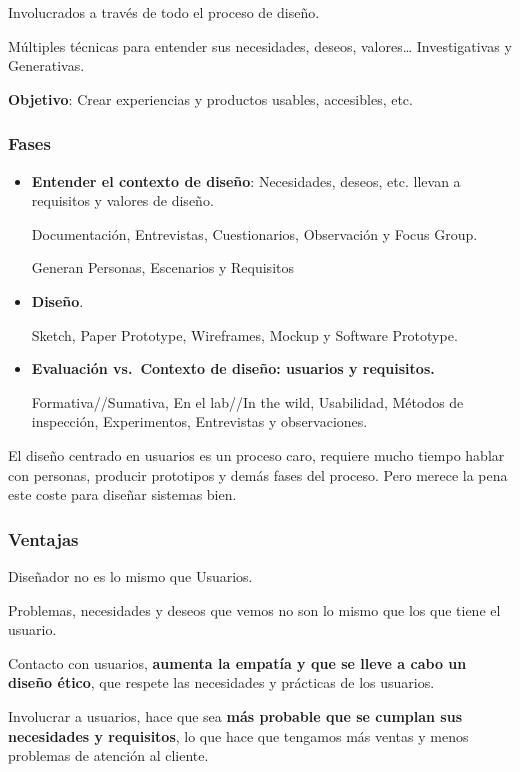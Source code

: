 Involucrados a través de todo el proceso de diseño.

Múltiples técnicas para entender sus necesidades, deseos,
valores\ldots{} Investigativas y Generativas.

\textbf{Objetivo}: Crear experiencias y productos usables, accesibles,
etc.

\hypertarget{fases}{%
\subsubsection{Fases}\label{fases}}

\begin{itemize}
\item
  \textbf{Entender el contexto de diseño}: Necesidades, deseos, etc.
  llevan a requisitos y valores de diseño.

  Documentación, Entrevistas, Cuestionarios, Observación y Focus Group.

  Generan Personas, Escenarios y Requisitos
\item
  \textbf{Diseño}.

  Sketch, Paper Prototype, Wireframes, Mockup y Software Prototype.
\item
  \textbf{Evaluación vs.~Contexto de diseño: usuarios y requisitos.}

  Formativa//Sumativa, En el lab//In the wild, Usabilidad, Métodos de
  inspección, Experimentos, Entrevistas y observaciones.
\end{itemize}

El diseño centrado en usuarios es un proceso caro, requiere mucho tiempo
hablar con personas, producir prototipos y demás fases del proceso. Pero
merece la pena este coste para diseñar sistemas bien.

\hypertarget{ventajas}{%
\subsubsection{Ventajas}\label{ventajas}}

Diseñador no es lo mismo que Usuarios.

Problemas, necesidades y deseos que vemos no son lo mismo que los que
tiene el usuario.

Contacto con usuarios, \textbf{aumenta la empatía y que se lleve a cabo
un diseño ético}, que respete las necesidades y prácticas de los
usuarios.

Involucrar a usuarios, hace que sea \textbf{más probable que se cumplan
sus necesidades y requisitos}, lo que hace que tengamos más ventas y
menos problemas de atención al cliente.


